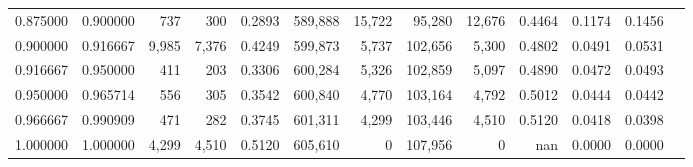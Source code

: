 \begin{tabular}{rrrrrrrrrrrrr}
0.875000 & 0.900000 &    737 &    300 &                                     0.2893 & 589,888 &  15,722 &  95,280 &  12,676 & 0.4464 & 0.1174 & 0.1456 \\
0.900000 & 0.916667 &  9,985 &  7,376 &                                     0.4249 & 599,873 &   5,737 & 102,656 &   5,300 & 0.4802 & 0.0491 & 0.0531 \\
0.916667 & 0.950000 &    411 &    203 &                                     0.3306 & 600,284 &   5,326 & 102,859 &   5,097 & 0.4890 & 0.0472 & 0.0493 \\
0.950000 & 0.965714 &    556 &    305 &                                     0.3542 & 600,840 &   4,770 & 103,164 &   4,792 & 0.5012 & 0.0444 & 0.0442 \\
0.966667 & 0.990909 &    471 &    282 &                                     0.3745 & 601,311 &   4,299 & 103,446 &   4,510 & 0.5120 & 0.0418 & 0.0398 \\
1.000000 & 1.000000 &  4,299 &  4,510 &                                     0.5120 & 605,610 &       0 & 107,956 &       0 &    nan & 0.0000 & 0.0000 \\
\bottomrule
\end{tabular}
